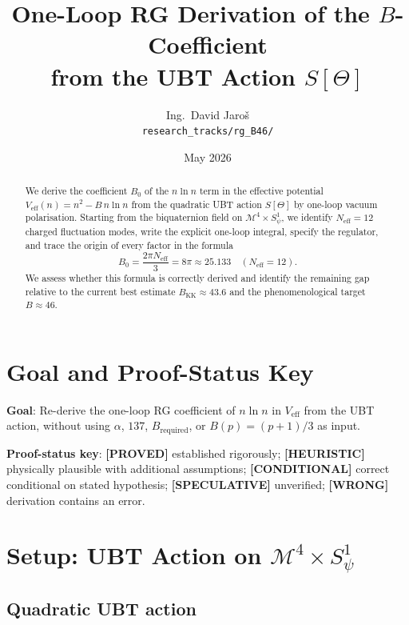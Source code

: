 \documentclass[11pt,a4paper]{article}
\title{One-Loop RG Derivation of the $B$-Coefficient\\
\large from the UBT Action $S[\Theta]$}
\author{Ing.\ David Jaro\v{s}\\
\small \texttt{research\_tracks/rg\_B46/}}
\date{May 2026}
\newcommand{\proved}[1]{\textbf{[PROVED]} #1}
\newcommand{\heuristic}[1]{\textbf{[HEURISTIC]} #1}
\newcommand{\speculative}[1]{\textbf{[SPECULATIVE]} #1}
\newcommand{\cond}[1]{\textbf{[CONDITIONAL]} #1}
\newcommand{\wrong}[1]{\textbf{[WRONG]} #1}
\begin{document}
\maketitle

\begin{abstract}
We derive the coefficient $B_0$ of the $n\ln n$ term in the effective potential
$V_\mathrm{eff}(n) = n^2 - B\,n\ln n$ from the quadratic UBT action $S[\Theta]$
by one-loop vacuum polarisation.  Starting from the biquaternion field on
$\mathcal{M}^4 \times S^1_\psi$, we identify $N_\mathrm{eff} = 12$ charged
fluctuation modes, write the explicit one-loop integral, specify the regulator,
and trace the origin of every factor in the formula
\[
  B_0 = \frac{2\pi N_\mathrm{eff}}{3} = 8\pi \approx 25.133
  \quad (N_\mathrm{eff} = 12).
\]
We assess whether this formula is correctly derived
and identify the remaining gap relative to the current best estimate
$B_\mathrm{KK} \approx 43.6$ and the phenomenological target $B \approx 46$.
\end{abstract}

\tableofcontents

\section{Goal and Proof-Status Key}

\textbf{Goal}: Re-derive the one-loop RG coefficient of $n\ln n$ in $V_\mathrm{eff}$
from the UBT action, without using $\alpha$, $137$, $B_\mathrm{required}$, or
$B(p)=(p+1)/3$ as input.

\medskip
\noindent
\textbf{Proof-status key}:
\proved{} established rigorously;
\heuristic{} physically plausible with additional assumptions;
\cond{} correct conditional on stated hypothesis;
\speculative{} unverified;
\wrong{} derivation contains an error.

\section{Setup: UBT Action on \texorpdfstring{$\mathcal{M}^4 \times S^1_\psi$}{M4 x S1}}

\subsection{Quadratic UBT action}
\end{document}
